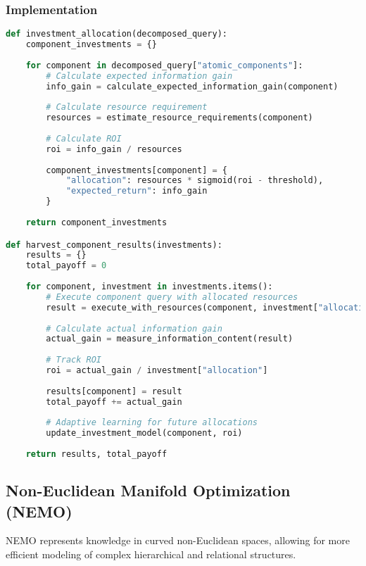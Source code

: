 \documentclass[journal,onecolumn]{IEEEtran}
\begin{document}
\subsubsection{Implementation}

\begin{lstlisting}[language=Python, caption=GQIC Implementation Pseudocode]
def investment_allocation(decomposed_query):
    component_investments = {}
    
    for component in decomposed_query["atomic_components"]:
        # Calculate expected information gain
        info_gain = calculate_expected_information_gain(component)
        
        # Calculate resource requirement
        resources = estimate_resource_requirements(component)
        
        # Calculate ROI
        roi = info_gain / resources
        
        component_investments[component] = {
            "allocation": resources * sigmoid(roi - threshold),
            "expected_return": info_gain
        }
    
    return component_investments

def harvest_component_results(investments):
    results = {}
    total_payoff = 0
    
    for component, investment in investments.items():
        # Execute component query with allocated resources
        result = execute_with_resources(component, investment["allocation"])
        
        # Calculate actual information gain
        actual_gain = measure_information_content(result)
        
        # Track ROI
        roi = actual_gain / investment["allocation"]
        
        results[component] = result
        total_payoff += actual_gain
        
        # Adaptive learning for future allocations
        update_investment_model(component, roi)
    
    return results, total_payoff
\end{lstlisting}

\subsection{Non-Euclidean Manifold Optimization (NEMO)}

NEMO represents knowledge in curved non-Euclidean spaces, allowing for more efficient modeling of complex hierarchical and relational structures.
\end{document}
